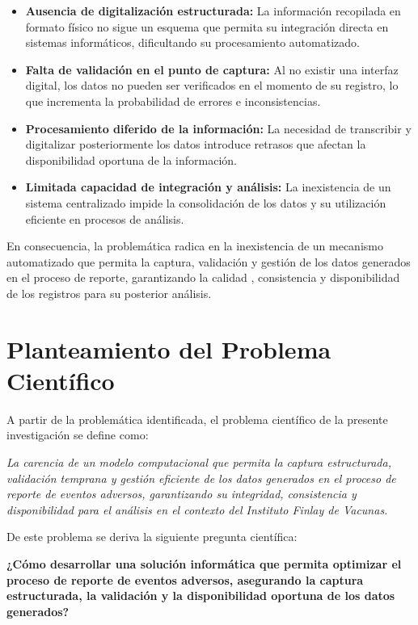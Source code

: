 \begin{itemize}
    \item \textbf{Ausencia de digitalización estructurada:} La información recopilada en formato físico no sigue un esquema que permita su integración directa en sistemas informáticos, dificultando su procesamiento automatizado.

    \item \textbf{Falta de validación en el punto de captura:} Al no existir una interfaz digital, los datos no pueden ser verificados en el momento de su registro, lo que incrementa la probabilidad de errores e inconsistencias.

    \item \textbf{Procesamiento diferido de la información:} La necesidad de transcribir y digitalizar posteriormente los datos introduce retrasos que afectan la disponibilidad oportuna de la información.

    \item \textbf{Limitada capacidad de integración y análisis:} La inexistencia de un sistema centralizado impide la consolidación de los datos y su utilización eficiente en procesos de análisis.
\end{itemize}

En consecuencia, la problemática radica en la inexistencia de un mecanismo automatizado que permita la captura, validación y gestión de los datos generados en el proceso de reporte, garantizando la calidad , consistencia y  disponibilidad de los registros para su posterior análisis.

\section{Planteamiento del Problema Científico}\label{section:planteamientoProblema}

A partir de la problemática identificada, el problema científico de la presente investigación se define como:

\textit{La carencia de un modelo computacional que permita la captura estructurada, validación temprana y gestión eficiente de los datos generados en el proceso de reporte de eventos adversos, garantizando su integridad, consistencia y disponibilidad para el análisis en el contexto del Instituto Finlay de Vacunas.}

De este problema se deriva la siguiente pregunta científica:

\textbf{¿Cómo desarrollar una solución informática que permita optimizar el proceso de reporte de eventos adversos, asegurando la captura estructurada, la validación y la disponibilidad oportuna de los datos generados?}

